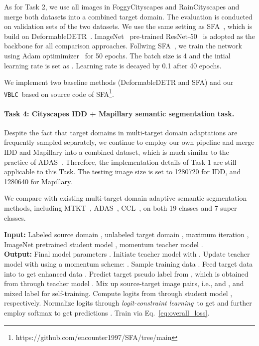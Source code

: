 \documentclass[letterpaper]{article} \usepackage{aaai23}  \usepackage{times}  \usepackage{helvet}  \usepackage{courier}  \usepackage[hyphens]{url}  \usepackage{graphicx} \urlstyle{rm} \def\UrlFont{\rm}  \usepackage{natbib}  \usepackage{caption} \frenchspacing  \setlength{\pdfpagewidth}{8.5in}  \setlength{\pdfpageheight}{11in}  \usepackage{algorithm}
\newcommand{\method}{\texttt{VBLC}~}
\newcommand{\lossModuleName}{\textit{logit-constraint learning}}
\begin{document}
As for Task 2, we use all images in FoggyCityscapes and RainCityscapes and merge both datasets into a combined target domain. The evaluation is conducted on validation sets of the two datasets. We use the same setting as SFA~\cite{Wang2021SFA}, which is build on DeformableDETR~\cite{DeformableDETR}. ImageNet~\cite{deng2009imagenet} pre-trained ResNet-50~\cite{he2016deep} is adopted as the backbone for all comparison approaches. Follwing SFA~\cite{Wang2021SFA}, we train the network using Adam optimimizer~\cite{KingmaB14} for 50 epochs. The batch size is 4 and the intial learning rate is set as . Learning rate is decayed by 0.1 after 40 epochs. 

We implement two baseline methods (DeformableDETR and SFA) and our \method based on source code of SFA\footnote{https://github.com/encounter1997/SFA/tree/main}.

\paragraph{Task 4: Cityscapes  IDD + Mapillary semantic segmentation task.} Despite the fact that target domains in multi-target domain adaptations are frequently sampled separately, we continue to employ our own pipeline and merge IDD and Mapillary into a combined dataset, which is much similar to the practice of ADAS~\cite{lee2022adas}. Therefore, the implementation details of Task 1 are still applicable to this Task. The testing image size is set to 1280720 for IDD, and 1280640 for Mapillary.

We compare with existing multi-target domain adaptive semantic segmentation methods, including MTKT~\cite{saporta2021multi}, ADAS~\cite{lee2022adas}, CCL~\cite{isobe2021multi}, on both 19 classes and 7 super classes.

\begin{algorithm}[t]
  \begin{algorithmic}[1] \caption{\method algorithm}
  \label{alg:algorithm}
  \STATE \textbf{Input:} Labeled source domain , unlabeled target domain , maximum iteration , ImageNet pretrained student model , momentum teacher model . \\
  \STATE \textbf{Output:} Final model parameters .
  \STATE Initiate teacher model  with .
  \STATE Update teacher model  with  using a momentum scheme: .
  \STATE Sample training data .
  \STATE Feed target data  into  to get enhanced data .
  \STATE Predict target pseudo label  from , which is obtained from  through teacher model .
  \STATE Mix up source-target image pairs, i.e.,  and , and mixed label  for self-training.
  \STATE Compute logits  from  through student model , respectively.
  \STATE Normalize logits through \lossModuleName~to get  and further employ softmax to get predictions .
  \STATE Train  via Eq.~\eqref{eq:overall_loss}.
  \ENDFOR
  \end{algorithmic}
\end{algorithm}
\end{document}

